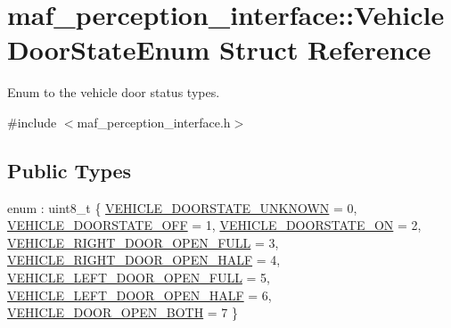 \hypertarget{structmaf__perception__interface_1_1VehicleDoorStateEnum}{}\section{maf\+\_\+perception\+\_\+interface\+:\+:Vehicle\+Door\+State\+Enum Struct Reference}
\label{structmaf__perception__interface_1_1VehicleDoorStateEnum}


Enum to the vehicle door status types.  




{\ttfamily \#include $<$maf\+\_\+perception\+\_\+interface.\+h$>$}

\subsection*{Public Types}
\begin{DoxyCompactItemize}
\item 
enum \+: uint8\+\_\+t \{ \newline
\hyperlink{structmaf__perception__interface_1_1VehicleDoorStateEnum_a7a0abd02235465d28d4f50e055d2dcc9a1d582cb29bdf9b30766baa43215526ad}{V\+E\+H\+I\+C\+L\+E\+\_\+\+D\+O\+O\+R\+S\+T\+A\+T\+E\+\_\+\+U\+N\+K\+N\+O\+WN} = 0, 
\hyperlink{structmaf__perception__interface_1_1VehicleDoorStateEnum_a7a0abd02235465d28d4f50e055d2dcc9a4a31a10e2b91402537ad86fbe36b79a5}{V\+E\+H\+I\+C\+L\+E\+\_\+\+D\+O\+O\+R\+S\+T\+A\+T\+E\+\_\+\+O\+FF} = 1, 
\hyperlink{structmaf__perception__interface_1_1VehicleDoorStateEnum_a7a0abd02235465d28d4f50e055d2dcc9ab24d59af022390c9d31f929f0aa8a53c}{V\+E\+H\+I\+C\+L\+E\+\_\+\+D\+O\+O\+R\+S\+T\+A\+T\+E\+\_\+\+ON} = 2, 
\hyperlink{structmaf__perception__interface_1_1VehicleDoorStateEnum_a7a0abd02235465d28d4f50e055d2dcc9af46a3bbfa84052b24e8a2aadacd8ebe4}{V\+E\+H\+I\+C\+L\+E\+\_\+\+R\+I\+G\+H\+T\+\_\+\+D\+O\+O\+R\+\_\+\+O\+P\+E\+N\+\_\+\+F\+U\+LL} = 3, 
\newline
\hyperlink{structmaf__perception__interface_1_1VehicleDoorStateEnum_a7a0abd02235465d28d4f50e055d2dcc9a594c158d9669c275e1fd7b353c059462}{V\+E\+H\+I\+C\+L\+E\+\_\+\+R\+I\+G\+H\+T\+\_\+\+D\+O\+O\+R\+\_\+\+O\+P\+E\+N\+\_\+\+H\+A\+LF} = 4, 
\hyperlink{structmaf__perception__interface_1_1VehicleDoorStateEnum_a7a0abd02235465d28d4f50e055d2dcc9a9985ee305863876ac3834d4f3870fdd0}{V\+E\+H\+I\+C\+L\+E\+\_\+\+L\+E\+F\+T\+\_\+\+D\+O\+O\+R\+\_\+\+O\+P\+E\+N\+\_\+\+F\+U\+LL} = 5, 
\hyperlink{structmaf__perception__interface_1_1VehicleDoorStateEnum_a7a0abd02235465d28d4f50e055d2dcc9a9d1f798ba11950d7c5b50919e9785d4f}{V\+E\+H\+I\+C\+L\+E\+\_\+\+L\+E\+F\+T\+\_\+\+D\+O\+O\+R\+\_\+\+O\+P\+E\+N\+\_\+\+H\+A\+LF} = 6, 
\hyperlink{structmaf__perception__interface_1_1VehicleDoorStateEnum_a7a0abd02235465d28d4f50e055d2dcc9a4f0d2921a8829c81bd0d46097f24efd6}{V\+E\+H\+I\+C\+L\+E\+\_\+\+D\+O\+O\+R\+\_\+\+O\+P\+E\+N\+\_\+\+B\+O\+TH} = 7
 \}
\end{DoxyCompactItemize}
